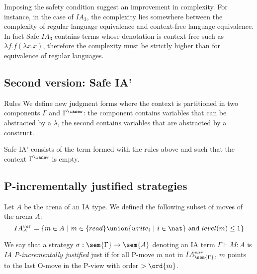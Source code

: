 Imposing the safety condition suggest an improvement in complexity.
For instance, in the case of $IA_3$, the complexity lies somewhere
between the complexity of regular language equivalence and
context-free language equivalence. In fact Safe $IA_3$ contains
terms whose denotation is context free such as $\lambda f . f
(\lambda x .x )$, therefore the complexity must be strictly higher
than for equivalence of regular languages.


\subsection{Second version: Safe IA'}

Rules We define new judgment forms where the context is partitioned
in two components $\Gamma$ and $\Gamma^{\ianew}$: the component
contains variables that can be abstracted by a $\lambda$, the second
contains variables that are abstracted by a \ianew construct.


Safe IA' consists of the term formed with the rules above and such
that the context $\Gamma^{\ianew}$ is empty.


\subsection{P-incrementally justified strategies}

Let $A$ be the arena of an IA type. We defined the following subset
of moves of the arena $A$:
$$ IA^{var}_{A} =\{ m \in A \ | \ m \in \{ read \} \union \{ write_i \ | \ i \in \nat \} \mbox{ and } level(m) \leq 1 \} $$



We say that a strategy $\sigma : \sem{\Gamma} \rightarrow \sem{A}$
denoting an IA term $\Gamma \vdash M :A$ is \emph{IA P-incrementally
justified} just if for all P-move $m$ not in
$IA^{var}_{\sem{\Gamma}}$, $m$ points to the last O-move in the
P-view with order $> \ord{m}$.






